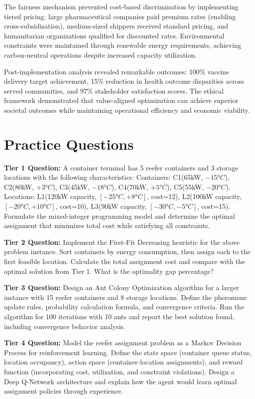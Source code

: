 \documentclass{article}
\begin{document}
The fairness mechanism prevented cost-based discrimination by implementing tiered pricing: large pharmaceutical companies paid premium rates (enabling cross-subsidization), medium-sized shippers received standard pricing, and humanitarian organizations qualified for discounted rates. Environmental constraints were maintained through renewable energy requirements, achieving carbon-neutral operations despite increased capacity utilization.

Post-implementation analysis revealed remarkable outcomes: 100\% vaccine delivery target achievement, 15\% reduction in health outcome disparities across served communities, and 97\% stakeholder satisfaction scores. The ethical framework demonstrated that value-aligned optimization can achieve superior societal outcomes while maintaining operational efficiency and economic viability.

\section{Practice Questions}

\textbf{Tier 1 Question:} A container terminal has 5 reefer containers and 3 storage locations with the following characteristics: Containers: C1(65kW, $-15°C$), C2(80kW, $+3°C$), C3(45kW, $-18°C$), C4(70kW, $+5°C$), C5(55kW, $-20°C$). Locations: L1(120kW capacity, $[-25°C, +8°C]$, cost=12), L2(100kW capacity, $[-20°C, +10°C]$, cost=10), L3(90kW capacity, $[-30°C, -5°C]$, cost=15). Formulate the mixed-integer programming model and determine the optimal assignment that minimizes total cost while satisfying all constraints.

\textbf{Tier 2 Question:} Implement the First-Fit Decreasing heuristic for the above problem instance. Sort containers by energy consumption, then assign each to the first feasible location. Calculate the total assignment cost and compare with the optimal solution from Tier 1. What is the optimality gap percentage?

\textbf{Tier 3 Question:} Design an Ant Colony Optimization algorithm for a larger instance with 15 reefer containers and 8 storage locations. Define the pheromone update rules, probability calculation formula, and convergence criteria. Run the algorithm for 100 iterations with 10 ants and report the best solution found, including convergence behavior analysis.

\textbf{Tier 4 Question:} Model the reefer assignment problem as a Markov Decision Process for reinforcement learning. Define the state space (container queue status, location occupancy), action space (container-location assignments), and reward function (incorporating cost, utilization, and constraint violations). Design a Deep Q-Network architecture and explain how the agent would learn optimal assignment policies through experience.
\end{document}

